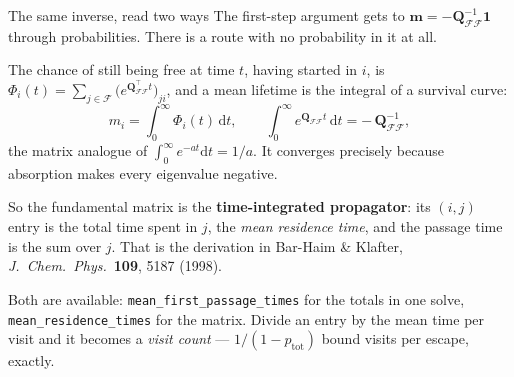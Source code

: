 \documentclass[10pt,aspectratio=169]{beamer}
\newcommand{\Q}{\bm{Q}}
\newcommand{\code}[1]{\texttt{\small #1}}
\begin{document}
\begin{frame}{The same inverse, read two ways}
  The first-step argument gets to
  $\bm{m}=-\Q_{\mathcal{F}\mathcal{F}}^{-1}\bm{1}$ through probabilities.
  There is a route with no probability in it at all.

  The chance of still being free at time $t$, having started in $i$, is
  $\Phi_i(t)=\sum_{j\in\mathcal{F}}\big(e^{\Q_{\mathcal{F}\mathcal{F}}^{\!\top}t}
  \big)_{ji}$, and a mean lifetime is the integral of a survival curve:
  \[
    m_i = \int_0^\infty \Phi_i(t)\,\mathrm{d}t ,
    \qquad
    \int_0^\infty e^{\Q_{\mathcal{F}\mathcal{F}}t}\,\mathrm{d}t
      = -\,\Q_{\mathcal{F}\mathcal{F}}^{-1} ,
  \]
  the matrix analogue of $\int_0^\infty e^{-at}\mathrm{d}t = 1/a$. It
  converges precisely because absorption makes every eigenvalue negative.

  \smallskip
  So the fundamental matrix is the \textbf{time-integrated propagator}: its
  $(i,j)$ entry is the total time spent in $j$, the \emph{mean residence
  time}, and the passage time is the sum over $j$. That is the derivation in
  Bar-Haim \& Klafter, \emph{J.\ Chem.\ Phys.}\ \textbf{109}, 5187 (1998).

  \smallskip
  Both are available: \code{mean\_first\_passage\_times} for the totals in
  one solve, \code{mean\_residence\_times} for the matrix. Divide an entry
  by the mean time per visit and it becomes a \emph{visit count} ---
  $1/(1-p_{\mathrm{tot}})$ bound visits per escape, exactly.
\end{frame}
\end{document}
